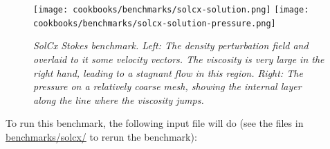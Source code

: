 \documentclass{article}
\begin{document}
\begin{figure}
  \begin{center}
    \texttt{[image: cookbooks/benchmarks/solcx-solution.png]}
    \hfill
    \texttt{[image: cookbooks/benchmarks/solcx-solution-pressure.png]}
    \caption{\it SolCx Stokes benchmark. Left: The density perturbation field
    and overlaid to it some velocity vectors. The viscosity is very large in the
      right hand, leading to a stagnant flow in this region. Right: The
      pressure on a relatively coarse mesh, showing the internal layer along
      the line where the viscosity jumps.}
    \label{fig:solcx}
  \end{center}
\end{figure}

To run this benchmark, the following input file will do (see the files in \url{benchmarks/solcx/} to rerun the benchmark):

\end{document}
